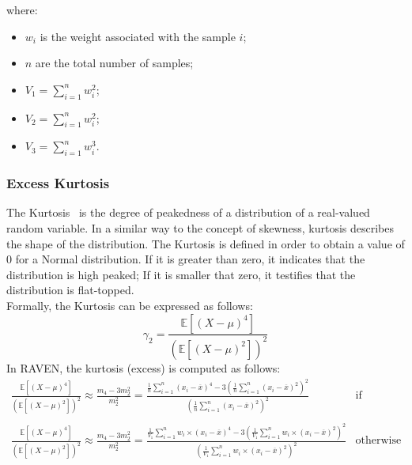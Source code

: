 where:
\begin{itemize}
  \item $w_{i}$ is the weight associated with the sample $i$;
  \item $n$ are the total number of samples;
  \item $V_{1} = \sum_{i=1}^{n} w_{i}^{2}$;
  \item $V_{2} = \sum_{i=1}^{n} w_{i}^{2}$;
  \item $V_{3} = \sum_{i=1}^{n} w_{i}^{3}$.
\end{itemize}

\subsubsection{Excess Kurtosis}
The  Kurtosis~\cite{Abramowitz}  is the degree of peakedness of a distribution of a real-valued random variable. In a similar way to the concept of skewness, kurtosis describes the shape of the distribution. The Kurtosis is defined in order to
obtain a value of $0$ for a Normal distribution. If it is greater than zero, it indicates that the distribution is high peaked; If it is smaller 
that zero, it testifies that the distribution is flat-topped.
\\Formally, the Kurtosis can be expressed as follows:
\begin{equation}
\gamma_{2} = \frac{ \mathbb{E}\left [ \left ( X-\mu \right )^{4} \right ]}{\left ( \mathbb{E}\left [ \left ( X-\mu \right )^{2} \right ] \right )^{2}} 
\end{equation}
In RAVEN, the kurtosis (excess) is computed as follows:
\begin{equation}
\begin{matrix}
\frac{ \mathbb{E}\left [ \left ( X-\mu \right )^{4} \right ]}{\left ( \mathbb{E}\left [ \left ( X-\mu \right )^{2} \right ] \right )^{2}}   \approx \frac{m_{4}-3m_{2}^{2}}{m_{2}^{2}} = \displaystyle  \frac{  \frac{1}{n} \sum_{i=1}^{n}  (x_{i} - \overline{x})^{4} -3\left ( \frac{1}{n} \sum_{i=1}^{n}  (x_{i} - \overline{x})^{2} \right )^{2}}{\left ( \frac{1}{n} \sum_{i=1}^{n}  (x_{i} - \overline{x})^{2} \right )^{2}} & \text{if random sampling}    
\\
\\
\frac{ \mathbb{E}\left [ \left ( X-\mu \right )^{4} \right ]}{\left ( \mathbb{E}\left [ \left ( X-\mu \right )^{2} \right ] \right )^{2}}   \approx \frac{m_{4}-3m_{2}^{2}}{m_{2}^{2}} = \displaystyle  \frac{  \frac{1}{V_{1}} \sum_{i=1}^{n} w_{i} \times (x_{i} - \overline{x})^{4} -3\left ( \frac{1}{V_{1}} \sum_{i=1}^{n}  w_{i} \times (x_{i} - \overline{x})^{2} \right )^{2}}{\left ( \frac{1}{V_{1}} \sum_{i=1}^{n}  w_{i} \times (x_{i} - \overline{x})^{2} \right )^{2}} &   \text{otherwise}
\end{matrix}
\end{equation}
